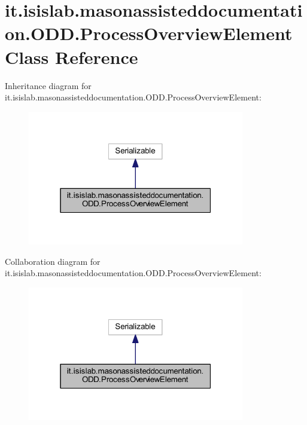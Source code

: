 \hypertarget{classit_1_1isislab_1_1masonassisteddocumentation_1_1_o_d_d_1_1_process_overview_element}{\section{it.\-isislab.\-masonassisteddocumentation.\-O\-D\-D.\-Process\-Overview\-Element Class Reference}
\label{classit_1_1isislab_1_1masonassisteddocumentation_1_1_o_d_d_1_1_process_overview_element}
}


Inheritance diagram for it.\-isislab.\-masonassisteddocumentation.\-O\-D\-D.\-Process\-Overview\-Element\-:\nopagebreak
\begin{figure}[H]
\begin{center}
\leavevmode
\includegraphics[width=268pt]{classit_1_1isislab_1_1masonassisteddocumentation_1_1_o_d_d_1_1_process_overview_element__inherit__graph}
\end{center}
\end{figure}


Collaboration diagram for it.\-isislab.\-masonassisteddocumentation.\-O\-D\-D.\-Process\-Overview\-Element\-:\nopagebreak
\begin{figure}[H]
\begin{center}
\leavevmode
\includegraphics[width=268pt]{classit_1_1isislab_1_1masonassisteddocumentation_1_1_o_d_d_1_1_process_overview_element__coll__graph}
\end{center}
\end{figure}
